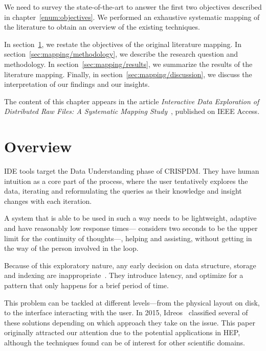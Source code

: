 
We need to survey the state-of-the-art to answer the first two objectives described in
chapter~\ref{enum:objectives}.
We performed an exhaustive systematic mapping of the literature to obtain an overview
of the existing techniques.

In section~\ref{sec:mapping/overview}, we restate the objectives of the original
literature mapping.
In section~\ref{sec:mapping/methodology}, we describe the research question and methodology.
In section~\ref{sec:mapping/results}, we summarize the results of the literature mapping.
Finally, in section~\ref{sec:mapping/discussion}, we discuss the interpretation of our findings and our insights.

The content of this chapter appears in the article
\emph{Interactive Data Exploration of Distributed Raw Files: A Systematic Mapping
Study}~\cite{Alvarez2019}, published on IEEE Access.

\section{Overview}
\label{sec:mapping/overview}
\gls{IDE} tools target the Data Understanding phase of \gls{CRISPDM}. They have
human intuition as a core part of the process, where the user tentatively
explores the data, iterating and reformulating the queries as
their knowledge and insight changes with each iteration.

A system that is able to be used in such a way needs to be lightweight, adaptive
and have reasonably low response times---\cite{Miller1968} considers two seconds
to be the upper limit for the continuity of thoughts---,
helping and assisting, without getting in the way of the person involved in
the loop.

Because of this exploratory nature, any early decision on data structure,
storage and indexing are inappropriate~\cite{Kersten2011}. They introduce latency,
and optimize for a pattern that only happens for a brief period of time.

This problem can be tackled at different levels---from the physical layout on disk,
to the interface interacting with the user. In 2015, Idreos~\cite{Idreos2015}
classified several of these solutions depending on which approach they take
on the issue. This paper originally attracted our attention  due to the potential
applications in \gls{HEP}\footnotemark, although
the techniques found can be of interest for other scientific domains.

